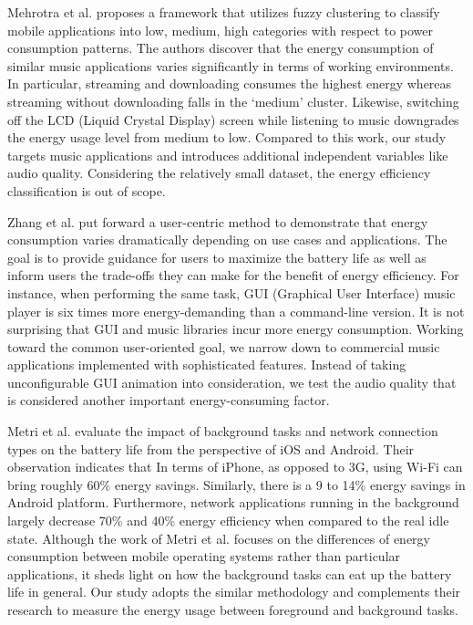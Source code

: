 Mehrotra et al. \cite{mehrotra2018analyse} proposes a framework that utilizes fuzzy clustering to classify mobile applications into low, medium, high categories with respect to power consumption patterns. The authors discover that the energy consumption of similar music applications varies significantly in terms of working environments. In particular, streaming and downloading consumes the highest energy whereas streaming without downloading falls in the ‘medium’ cluster. Likewise, switching off the {\color{blue}LCD (Liquid Crystal Display) screen} while listening to music downgrades the energy usage level from medium to low. Compared to this work, our study targets music applications and introduces additional independent variables like audio quality. {\color{blue} Considering the relatively small dataset, the energy efficiency classification is out of scope.} 

Zhang et al. \cite{zhang2014impact} put forward a user-centric method to demonstrate that energy consumption varies dramatically depending on use cases and applications. The goal is to provide guidance for users to maximize the battery life as well as inform users the trade-offs they can make for the benefit of energy efficiency. For instance, when performing the same task, {\color{blue}GUI (Graphical User Interface)} music player is six times more energy-demanding than a command-line version. It is not surprising that GUI and music libraries incur more energy consumption. Working toward the common user-oriented goal, we narrow down to commercial music applications implemented with sophisticated features. Instead of taking unconfigurable GUI animation into consideration, we test the audio quality that is considered another important energy-consuming factor. 

Metri et al. \cite{metri2012eating}  evaluate the impact of background tasks and network connection types on the battery life from the perspective of iOS and Android. Their observation indicates that In terms of iPhone, as opposed to 3G, using Wi-Fi can bring roughly 60\% energy savings. Similarly, there is a 9 to 14\% energy savings in Android platform. Furthermore, network applications running in the background largely decrease 70\% and 40\% energy efficiency when compared to the real idle state. Although the work of Metri et al. focuses on the differences of energy consumption between {\color{blue}mobile operating systems} rather than particular applications, it sheds light on how the background tasks can eat up the battery life in general. Our study adopts the similar methodology and complements their research to measure the energy usage between foreground and background tasks. 

